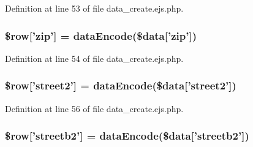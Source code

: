 \-Definition at line 53 of file data\-\_\-create.\-ejs.\-php.

\hypertarget{miscellaneous_2mysettings_2data__create_8ejs_8php_a43a082263bffe64821abd5386c374ea3}{
\subsubsection[{\$row}]{\setlength{\rightskip}{0pt plus 5cm}\$row\mbox{[}'zip'\mbox{]} = {\bf data\-Encode}(\$data\mbox{[}'zip'\mbox{]})}}\label{miscellaneous_2mysettings_2data__create_8ejs_8php_a43a082263bffe64821abd5386c374ea3}


\-Definition at line 54 of file data\-\_\-create.\-ejs.\-php.

\hypertarget{miscellaneous_2mysettings_2data__create_8ejs_8php_a56dde69befd76ea6b3273932cf517c8e}{
\subsubsection[{\$row}]{\setlength{\rightskip}{0pt plus 5cm}\$row\mbox{[}'street2'\mbox{]} = {\bf data\-Encode}(\$data\mbox{[}'street2'\mbox{]})}}\label{miscellaneous_2mysettings_2data__create_8ejs_8php_a56dde69befd76ea6b3273932cf517c8e}


\-Definition at line 56 of file data\-\_\-create.\-ejs.\-php.

\hypertarget{miscellaneous_2mysettings_2data__create_8ejs_8php_a8ea62ae310fd8899b5da0f1522723386}{
\subsubsection[{\$row}]{\setlength{\rightskip}{0pt plus 5cm}\$row\mbox{[}'streetb2'\mbox{]} = {\bf data\-Encode}(\$data\mbox{[}'streetb2'\mbox{]})}}\label{miscellaneous_2mysettings_2data__create_8ejs_8php_a8ea62ae310fd8899b5da0f1522723386}



